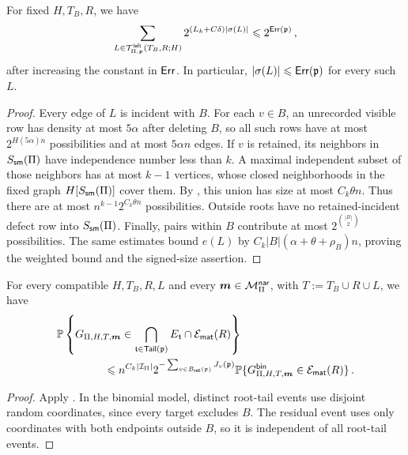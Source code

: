 \begin{lemma}\label{lemma:profile-root-leftover-bound-K1k}
For fixed $H,T_B,R$, we have
$$\sum_{L\in{\mathcal T}^{\hspace{0.2mm}\mathsf{left}}_{\Pi,{\mathfrak p}}(T_B,R;H)}2^{(L_k+C\delta)|\sigma(L)|}\leqslant2^{{\mathsf{Err}}({\mathfrak p})}\,,$$
after increasing the constant in ${\mathsf{Err}}$. In particular, $|\sigma(L)|\leqslant{\ensuremath\mathsf{Err}}({\mathfrak p})$ for every such $L$.
\end{lemma}
\begin{proof}
Every edge of $L$ is incident with $B$. For each $v\in B$, an unrecorded visible row has density at most $5\alpha$ after deleting $B$, so all such rows have at most $2^{H(5\alpha)n}$ possibilities and at most $5\alpha n$ edges. If $v$ is retained, its neighbors in $S_{\mathsf{sm}}(\Pi)$ have independence number less than $k$. A maximal independent subset of those neighbors has at most $k-1$ vertices, whose closed neighborhoods in the fixed graph $H[S_{\mathsf{sm}}(\Pi)]$ cover them. By , this union has size at most $C_k\theta n$. Thus there are at most $n^{k-1}2^{C_k\theta n}$ possibilities. Outside roots have no retained-incident defect row into $S_{\mathsf{sm}}(\Pi)$. Finally, pairs within $B$ contribute at most $2^{\binom{|B|}{2}}$ possibilities. The same estimates bound $e(L)$ by $C_k|B|(\alpha+\theta+\rho_B)n$, proving the weighted bound and the signed-size assertion.
\end{proof}

\begin{lemma}\label{lemma:fixed-profile-probability-K1k}
For every compatible $H,T_B,R,L$ and every $\boldsymbol{m}\in{\mathcal M}^{\mathsf{nar}}_\Pi$, with $T:=T_B\cup R\cup L$, we have
\begin{align*}
&\bbP\left\{G_{\Pi,H,T,\bsm}\in\bigcap_{\frt\in\Tail(\frp)}E_\frt\cap\cE_\matsf(R)\right\}\\
&\hspace{15mm}\leq n^{C_k|\cI_\Pi|}2^{-\sum_{v\in B_\ret(\frp)}J_v(\frp)}\bbP\{G^\bin_{\Pi,H,T,\bsm}\in\cE_\matsf(R)\}\,.
\end{align*}
\end{lemma}
\begin{proof}
Apply . In the binomial model, distinct root-tail events use disjoint random coordinates, since every target excludes $B$. The residual event uses only coordinates with both endpoints outside $B$, so it is independent of all root-tail events.
\end{proof}

